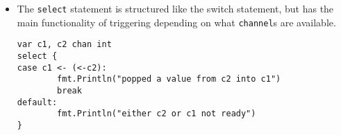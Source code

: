 \documentclass[12pt]{article}
\begin{document}
\begin{itemize}
\begin{verbatim}
c := ' '
switch c { /* match-style usage */
case ' ', '\t', '\n', '\r':
    fmt.Println("space")
default:
    fmt.Println("not a space")
    
}
        \end{verbatim}
    \item The \texttt{select} statement is structured like the switch
        statement, but has the main functionality of triggering depending
        on what \texttt{channel}s are available.
        \begin{verbatim}
var c1, c2 chan int
select {
case c1 <- (<-c2):
        fmt.Println("popped a value from c2 into c1")
        break
default:
        fmt.Println("either c2 or c1 not ready")
}
        \end{verbatim}
\end{itemize}
    
\end{document}

